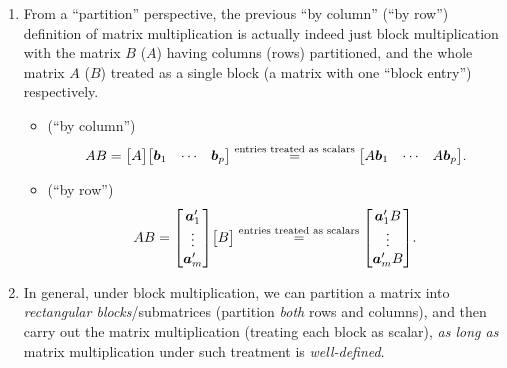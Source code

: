 \begin{enumerate}
\item From a ``partition'' perspective, the previous ``by column'' (``by row'')
definition of matrix multiplication is actually indeed just block
multiplication with the matrix \(B\) (\(A\)) having columns (rows)
partitioned, and the whole matrix \(A\) (\(B\)) treated as a single block (a
matrix with one ``block entry'') respectively.
\begin{itemize}
\item (``by column'') \[
AB=\mqty[A]\mqty[\vect{b}_{1}&\cdots&\vect{b}_{p}]
\overset{\text{entries treated as scalars}}{=}\mqty[A\vect{b}_{1}&\cdots&A\vect{b}_{p}].
\]
\item (``by row'') \[
AB=\mqty[\vect{a}_{1}'\\ \vdots\\ \vect{a}_{m}']\mqty[B]
\overset{\text{entries treated as scalars}}{=}\mqty[\vect{a}_{1}'B\\ \vdots\\ \vect{a}_{m}'B].
\]
\end{itemize}

\item In general, under block multiplication, we can partition a matrix into
\emph{rectangular blocks}/submatrices (partition \emph{both} rows and columns),
and then carry out the matrix multiplication (treating each block as scalar),
\emph{as long as} matrix multiplication under such treatment is
\emph{well-defined}.


\end{enumerate}

